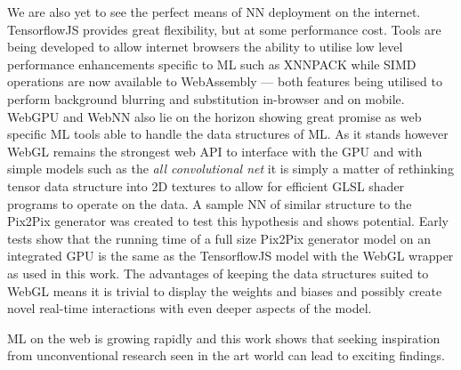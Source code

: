 \documentclass{article}
\begin{document}
We are also yet to see the perfect means of NN deployment on the internet. TensorflowJS provides great flexibility, but at some performance cost. Tools are being developed to allow internet browsers the ability to utilise low level performance enhancements specific to ML such as XNNPACK\cite{XNNPACK} while SIMD operations are now available to WebAssembly\cite{SIMD} --- both features being utilised to perform background blurring and substitution in-browser and on mobile\cite{google_background}. WebGPU\cite{webgpu} and WebNN\cite{webnn} also lie on the horizon showing great promise as web specific ML tools able to handle the data structures of ML. As it stands however WebGL remains the strongest web API to interface with the GPU and with simple models such as the \textit{all convolutional net} it is simply a matter of rethinking tensor data structure into 2D textures to allow for efficient GLSL shader programs to operate on the data. A sample NN of similar structure to the Pix2Pix generator was created to test this hypothesis and shows potential. Early tests show that the running time of a full size Pix2Pix generator model on an integrated GPU is the same as the TensorflowJS model with the WebGL wrapper as used in this work. The advantages of keeping the data structures suited to WebGL means it is trivial to display the weights and biases and possibly create novel real-time interactions with even deeper aspects of the model.

ML on the web is growing rapidly and this work shows that seeking inspiration from unconventional research seen in the art world can lead to exciting findings.


\medskip
\printbibliography

\end{document}
